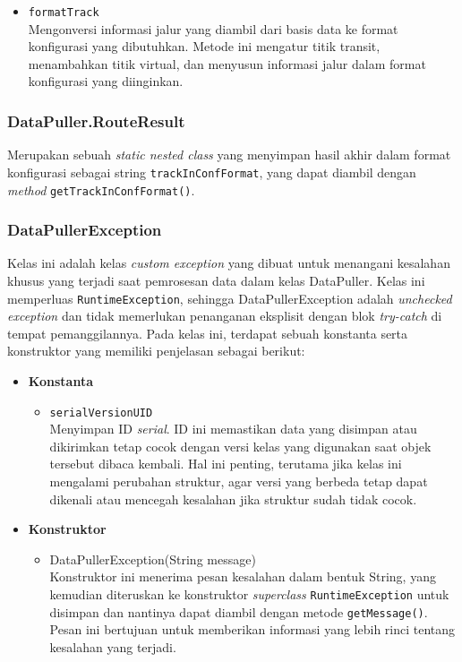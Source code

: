 \begin{itemize}
\begin{itemize}
         \item \texttt{formatTrack}
         \\ Mengonversi informasi jalur yang diambil dari basis data ke format konfigurasi yang dibutuhkan. Metode ini mengatur titik transit, menambahkan titik virtual, dan menyusun informasi jalur dalam format konfigurasi yang diinginkan.
    \end{itemize}
\end{itemize}

\subsubsection{DataPuller.RouteResult}
Merupakan sebuah \textit{static nested class} yang menyimpan hasil akhir dalam format konfigurasi sebagai string \texttt{trackInConfFormat}, yang dapat diambil dengan \textit{method} \texttt{getTrackInConfFormat()}.

\subsubsection{DataPullerException}
Kelas ini adalah kelas \textit{custom exception} yang dibuat untuk menangani kesalahan khusus yang terjadi saat pemrosesan data dalam kelas DataPuller. Kelas ini memperluas \texttt{RuntimeException}, sehingga DataPullerException adalah \textit{unchecked exception} dan tidak memerlukan penanganan eksplisit dengan blok \textit{try-catch} di tempat pemanggilannya. Pada kelas ini, terdapat sebuah konstanta serta konstruktor yang memiliki penjelasan sebagai berikut:
\begin{itemize}
    \item \textbf{Konstanta}
    \begin{itemize}
        \item \texttt{serialVersionUID}
        \\ Menyimpan ID \textit{serial}. ID ini memastikan data yang disimpan atau dikirimkan tetap cocok dengan versi kelas yang digunakan saat objek tersebut dibaca kembali. Hal ini penting, terutama jika kelas ini mengalami perubahan struktur, agar versi yang berbeda tetap dapat dikenali atau mencegah kesalahan jika struktur sudah tidak cocok.
    \end{itemize}
\newpage
    \item \textbf{Konstruktor}
    \begin{itemize}
        \item DataPullerException(String message)
        \\ Konstruktor ini menerima pesan kesalahan dalam bentuk String, yang kemudian diteruskan ke konstruktor \textit{superclass} \texttt{RuntimeException} untuk disimpan dan nantinya dapat diambil dengan metode \texttt{getMessage()}. Pesan ini bertujuan untuk memberikan informasi yang lebih rinci tentang kesalahan yang terjadi.
    \end{itemize}
\end{itemize}

